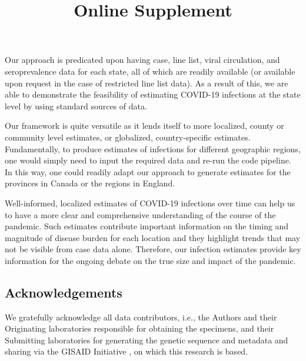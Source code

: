 \documentclass{article}
\newcommand{\beginsupplement}{
  \setcounter{table}{0}  
  \renewcommand{\thetable}{S\arabic{table}} 
  \setcounter{figure}{0} 
  \renewcommand{\thefigure}{S\arabic{figure}}
  \setcounter{section}{0} 
  \renewcommand{\thesection}{S\arabic{section}}
}
\begin{document}
Our approach is predicated upon having case, line list, viral circulation, and
seroprevalence data for each state, all of which are readily available (or
available upon request in the case of restricted line list data). As a result of
this, we are able to demonstrate the feasibility of estimating COVID-19
infections at the state level by using standard sources of data. 

Our framework is quite versatile as it lends itself to more localized, county or
community level estimates, or globalized, country-specific estimates.
Fundamentally, to produce estimates of infections for different geographic
regions, one would simply need to input the required data and re-run the code
pipeline. In this way, one could readily adapt our approach to generate
estimates for the provinces in Canada or the regions in England.

Well-informed, localized estimates of COVID-19 infections over time can help us
to have a more clear and comprehensive understanding of the course of the
pandemic. Such estimates contribute important information on the timing and
magnitude of disease burden for each location and they highlight trends that may
not be visible from case data alone. Therefore, our infection estimates provide
key information for the ongoing debate on the true size and impact of the
pandemic.



\subsection*{Acknowledgements}

We gratefully acknowledge all data contributors, i.e., the Authors and their
Originating laboratories responsible for obtaining the specimens, and their
Submitting laboratories for generating the genetic sequence and metadata and
sharing via the GISAID Initiative \citep{elbe2017data}, on which this research
is based.



\newpage


\newpage
\beginsupplement
\title{\supptitlefont Online Supplement}
\maketitle
\end{document}

